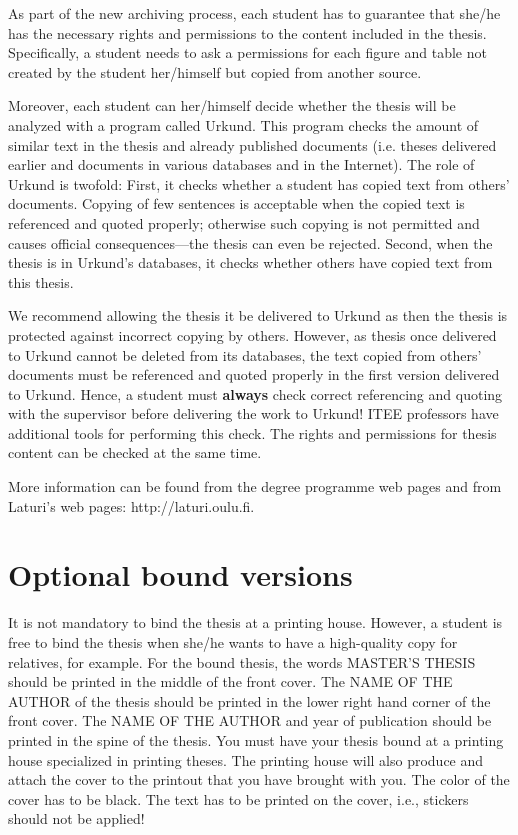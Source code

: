 As part of the new archiving process, each student has to guarantee that she/he has the necessary rights and permissions to the content included in the thesis. Specifically, a student needs to ask a permissions for each figure and table not created by the student her/himself but copied from another source.

Moreover, each student can her/himself decide whether the thesis will be analyzed with a program called Urkund. This program checks the amount of similar text in the thesis and already published documents (i.e. theses delivered earlier and documents in various databases and in the Internet). The role of Urkund is twofold: First, it checks whether a student has copied text from others’ documents. Copying of few sentences is acceptable when the copied text is referenced and quoted properly; otherwise such copying is not permitted and causes official consequences---the thesis can even be rejected. Second, when the thesis is in Urkund’s databases, it checks whether others have copied text from this thesis.

We recommend allowing the thesis it be delivered to Urkund as then the thesis is protected against incorrect copying by others. However, as thesis once delivered to Urkund cannot be deleted from its databases, the text copied from others’ documents must be referenced and quoted properly in the first version delivered to Urkund. Hence, a student must \textbf{always} check correct referencing and quoting with the supervisor before delivering the work to Urkund! ITEE professors have additional tools for performing this check. The rights and permissions for thesis content can be checked at the same time.

More information can be found from the degree programme web pages \cite{mscstudies} and from Laturi’s web pages: http://laturi.oulu.fi.


\section{Optional bound versions}

It is not mandatory to bind the thesis at a printing house. However, a student is free to bind the thesis when she/he wants to have a high-quality copy for relatives, for example. For the bound thesis, the words MASTER’S THESIS should be printed in the middle of the front cover. The NAME OF THE AUTHOR of the thesis should be printed in the lower right hand corner of the front cover. The NAME OF THE AUTHOR and year of publication should be printed in the spine of the thesis. You must have your thesis bound at a printing house specialized in printing theses. The printing house will also produce and attach the cover to the printout that you have brought with you. The color of the cover has to be black. The text has to be printed on the cover, i.e., stickers should not be applied!
